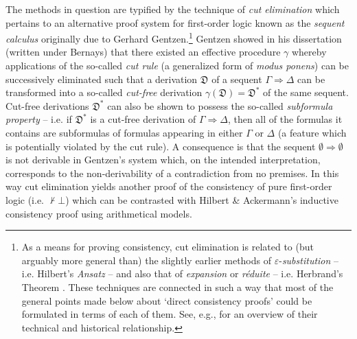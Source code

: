 \documentclass[11pt,fleqn,leqno]{article}
\def\proves{\vdash}
\begin{document}
The methods in question are typified by the technique of \textsl{cut elimination} which pertains to an alternative proof system for first-order logic known as the \textsl{sequent calculus} originally due to Gerhard Gentzen.\footnote{As a means for proving consistency, cut elimination is related to (but arguably more general than) the slightly earlier methods of $\varepsilon$-\textsl{substitution}  -- i.e. Hilbert's \textsl{Ansatz} \citeyearpar{Hilbert1923} -- and also that of \textsl{expansion} or \textsl{r\'eduite} -- i.e. Herbrand's Theorem \citeyearpar{Herbrand1930a}.   These techniques are connected in such a way that most of the general points made below about `direct consistency proofs' could be formulated in terms of each of them.    See, e.g., \citep{Rathjen2018} for an overview of their technical and historical relationship.}  Gentzen showed in his dissertation (written under Bernays) that there existed an effective procedure $\gamma$ whereby applications of the so-called \textsl{cut rule} (a generalized form of \textsl{modus ponens}) can be successively eliminated such that a derivation $\mathfrak{D}$ of a sequent $\Gamma \Rightarrow \Delta$ can be transformed into a so-called \textsl{cut-free} derivation $\gamma(\mathfrak{D}) = \mathfrak{D}^*$ of the same sequent.  Cut-free derivations $\mathfrak{D}^*$ can also be shown to possess the so-called \textsl{subformula property} -- i.e. if $\mathfrak{D}^*$ is a cut-free derivation of $\Gamma \Rightarrow \Delta$, then all of the formulas it contains are subformulas of formulas appearing in either $\Gamma$ or $\Delta$ (a feature which is potentially violated by the cut rule).  A consequence is that the sequent $\emptyset \Rightarrow \emptyset$ is not derivable in Gentzen's system which, on the intended interpretation, corresponds to the non-derivability of a contradiction from no premises.  In this way cut elimination yields another proof of the consistency of pure first-order logic (i.e. $\not\proves \bot$)  which can be contrasted with Hilbert \& Ackermann's inductive consistency proof using arithmetical models. 
 
\end{document}
